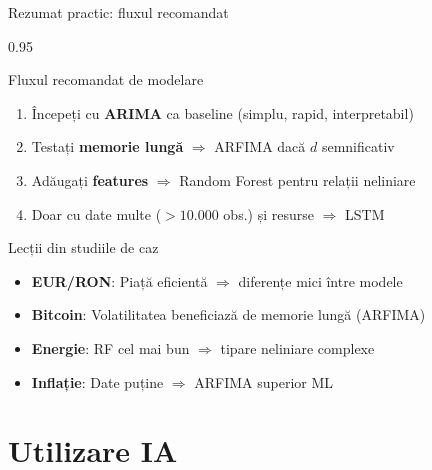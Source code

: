 \documentclass[9pt, aspectratio=169, t]{beamer}
\begin{document}
\begin{frame}{Rezumat practic: fluxul recomandat}
    \begin{cminipage}{0.95\textwidth}
        \begin{block}{Fluxul recomandat de modelare}
            \begin{enumerate}\setlength{\itemsep}{2pt}
                \item Începeți cu \textbf{ARIMA} ca baseline (simplu, rapid, interpretabil)
                \item Testați \textbf{memorie lungă} $\Rightarrow$ ARFIMA dacă $d$ semnificativ
                \item Adăugați \textbf{features} $\Rightarrow$ Random Forest pentru relații neliniare
                \item Doar cu date multe ($>10.000$ obs.) și resurse $\Rightarrow$ LSTM
            \end{enumerate}
        \end{block}

        \vspace{0.2cm}

        \begin{alertblock}{Lecții din studiile de caz}
            \begin{itemize}\setlength{\itemsep}{0pt}
                \item \textbf{EUR/RON}: Piață eficientă $\Rightarrow$ diferențe mici între modele
                \item \textbf{Bitcoin}: Volatilitatea beneficiază de memorie lungă (ARFIMA)
                \item \textbf{Energie}: RF cel mai bun $\Rightarrow$ tipare neliniare complexe
                \item \textbf{Inflație}: Date puține $\Rightarrow$ ARFIMA superior ML
            \end{itemize}
        \end{alertblock}
    \end{cminipage}
\end{frame}

\section{Utilizare IA}
\end{document}
